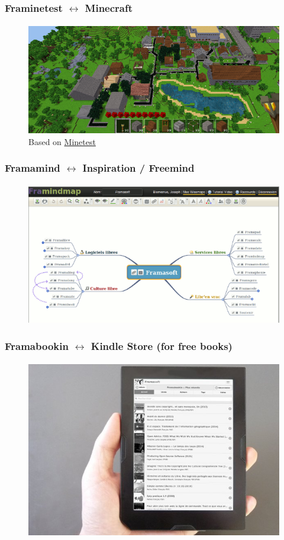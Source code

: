 	\begin{frame}
	\frametitle{Framinetest $\leftrightarrow$ Minecraft}
	\framesubtitle{}
	        \begin{figure}[h]
                \centering
                \includegraphics[width=.8\textwidth]{../pics/framinetest}
		\caption{Based on \href{http://www.minetest.net}{Minetest}}
        	\end{figure}
	\end{frame}

	\begin{frame}
	\frametitle{Framamind $\leftrightarrow$ Inspiration / Freemind}
	\framesubtitle{}
	        \begin{figure}[h]
                \centering
                \includegraphics[width=.8\textwidth]{../pics/framamind}
        	\end{figure}
	\end{frame}

	\begin{frame}
	\frametitle{Framabookin $\leftrightarrow$ Kindle Store (for free books)}
	\framesubtitle{}
	        \begin{figure}[h]
                \centering
                \includegraphics[width=.8\textwidth]{../pics/framabookin}
        	\end{figure}
	\end{frame}

